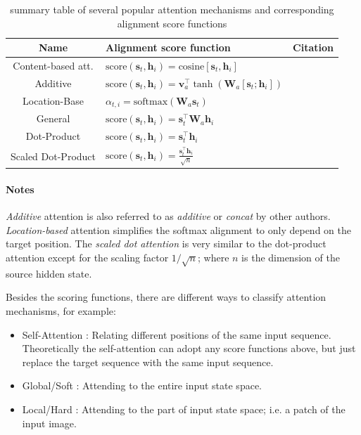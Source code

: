 \begin{table}[hpt]
\caption{summary table of several popular attention mechanisms and corresponding alignment score functions}
\label{tab:attention-mechanisms}
\begin{tabular}{cll}
Name & Alignment score function & Citation \\
\hline
Content-based att. & $\text{score}(\boldsymbol{s}_t, \boldsymbol{h}_i) = \text{cosine}[\boldsymbol{s}_t, \boldsymbol{h}_i]$ & \citep{Graves2014} \\
Additive & $\text{score}(\boldsymbol{s}_t, \boldsymbol{h}_i) = \mathbf{v}_a^\top \tanh(\mathbf{W}_a[\boldsymbol{s}_t; \boldsymbol{h}_i])$ & \citep{Bahdanau2015} \\
Location-Base & $\alpha_{t,i} = \text{softmax}(\mathbf{W}_a \boldsymbol{s}_t)$ & \citep{Luong2015} \\
General & $\text{score}(\boldsymbol{s}_t, \boldsymbol{h}_i) = \boldsymbol{s}_t^\top\mathbf{W}_a\boldsymbol{h}_i$ & \citep{Luong2015} \\
Dot-Product & $\text{score}(\boldsymbol{s}_t, \boldsymbol{h}_i) = \boldsymbol{s}_t^\top\boldsymbol{h}_i$ & \citep{Luong2015} \\
Scaled Dot-Product & $\text{score}(\boldsymbol{s}_t, \boldsymbol{h}_i) = \frac{\boldsymbol{s}_t^\top\boldsymbol{h}_i}{\sqrt{n}}$  & \citep{Vaswani2017}
\end{tabular}
\end{table}

\paragraph{Notes} \textit{Additive} attention is also referred to as \textit{additive} or \textit{concat} by other authors. \textit{Location-based} attention simplifies the softmax alignment to only depend on the target position. The \textit{scaled dot attention} is very similar to the dot-product attention except for the scaling factor $1/\sqrt{n}$; where $n$ is the dimension of the source hidden state.

Besides the scoring functions, there are different ways to classify attention mechanisms, for example:

\begin{itemize}
    \item Self-Attention \citep{Cheng2016}: Relating different positions of the same input sequence. Theoretically the self-attention can adopt any score functions above, but just replace the target sequence with the same input sequence. 
    \item Global/Soft \cite{Xu2015}: Attending to the entire input state space. 
    \item Local/Hard \citep{Xu2015, Luong2015}: Attending to the part of input state space; i.e. a patch of the input image.
\end{itemize}

